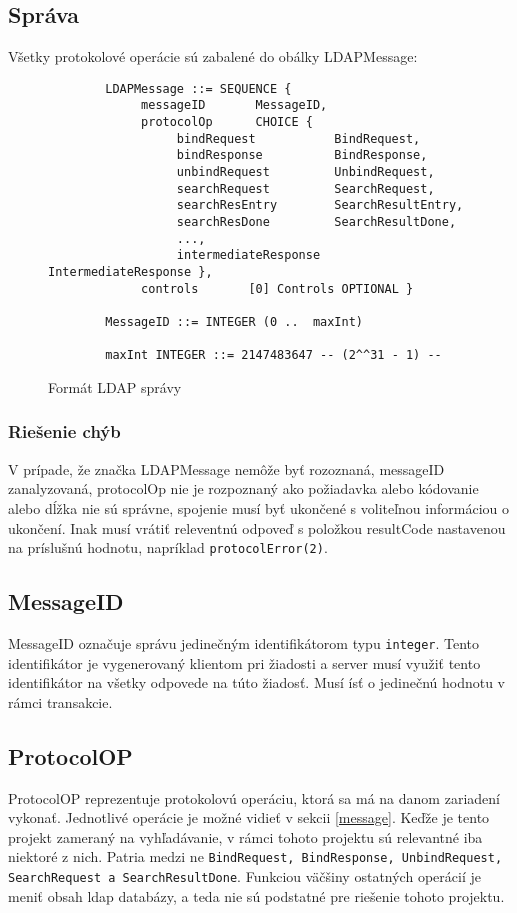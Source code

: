 \documentclass[11pt,a4paper]{article}
\begin{document}
\subsection{Správa\label{message}}
\cite{rfc4511}Všetky protokolové operácie sú zabalené do obálky LDAPMessage:
\begin{figure}[H]
\begin{verbatim}
        LDAPMessage ::= SEQUENCE {
             messageID       MessageID,
             protocolOp      CHOICE {
                  bindRequest           BindRequest,
                  bindResponse          BindResponse,
                  unbindRequest         UnbindRequest,
                  searchRequest         SearchRequest,
                  searchResEntry        SearchResultEntry,
                  searchResDone         SearchResultDone,
                  ...,
                  intermediateResponse  IntermediateResponse },
             controls       [0] Controls OPTIONAL }

        MessageID ::= INTEGER (0 ..  maxInt)

        maxInt INTEGER ::= 2147483647 -- (2^^31 - 1) --
\end{verbatim}
\caption{Formát LDAP správy}
\end{figure}

\subsubsection{Riešenie chýb}
V prípade, že značka LDAPMessage nemôže byť rozoznaná, messageID zanalyzovaná, protocolOp nie je rozpoznaný ako požiadavka alebo kódovanie alebo dĺžka nie sú správne, spojenie musí byť ukončené s voliteľnou informáciou o ukončení. Inak musí vrátiť releventnú odpoveď s položkou resultCode nastavenou na príslušnú hodnotu, napríklad \texttt{protocolError(2)}. 

\subsection{MessageID}
MessageID označuje správu jedinečným identifikátorom typu \texttt{integer}. Tento identifikátor je vygenerovaný klientom pri žiadosti a server musí využiť tento identifikátor na všetky odpovede na túto žiadosť. Musí ísť o jedinečnú hodnotu v rámci transakcie.

\subsection{ProtocolOP}
ProtocolOP reprezentuje protokolovú operáciu, ktorá sa má na danom zariadení vykonať. Jednotlivé operácie je možné vidieť v sekcii \ref{message}. Keďže je tento projekt zameraný na vyhľadávanie, v rámci tohoto projektu sú relevantné iba niektoré z nich. Patria medzi ne \texttt{BindRequest, BindResponse, UnbindRequest, SearchRequest a SearchResultDone}. Funkciou väčšiny ostatných operácií je meniť obsah ldap databázy, a teda nie sú podstatné pre riešenie tohoto projektu.
\end{document}

